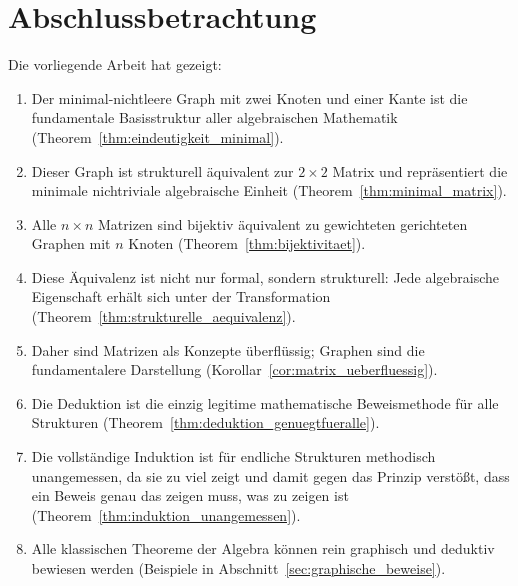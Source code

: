 \documentclass[12pt, a4paper]{article}
\theoremstyle{definition}
\theoremstyle{remark}
\begin{document}
\section{Abschlussbetrachtung}
\label{sec:abschluss}

Die vorliegende Arbeit hat gezeigt:

\begin{enumerate}[label=(\roman*)]
  \item Der minimal-nichtleere Graph mit zwei Knoten und einer Kante ist die fundamentale Basisstruktur aller algebraischen Mathematik (Theorem~\ref{thm:eindeutigkeit_minimal}).
  
  \item Dieser Graph ist strukturell äquivalent zur $2 \times 2$ Matrix und repräsentiert die minimale nichtriviale algebraische Einheit (Theorem~\ref{thm:minimal_matrix}).
  
  \item Alle $n \times n$ Matrizen sind bijektiv äquivalent zu gewichteten gerichteten Graphen mit $n$ Knoten (Theorem~\ref{thm:bijektivitaet}).
  
  \item Diese Äquivalenz ist nicht nur formal, sondern strukturell: Jede algebraische Eigenschaft erhält sich unter der Transformation (Theorem~\ref{thm:strukturelle_aequivalenz}).
  
  \item Daher sind Matrizen als Konzepte überflüssig; Graphen sind die fundamentalere Darstellung (Korollar~\ref{cor:matrix_ueberfluessig}).
  
  \item Die Deduktion ist die einzig legitime mathematische Beweismethode für alle Strukturen (Theorem~\ref{thm:deduktion_genuegtfueralle}).
  
  \item Die vollständige Induktion ist für endliche Strukturen methodisch unangemessen, da sie zu viel zeigt und damit gegen das Prinzip verstößt, dass ein Beweis genau das zeigen muss, was zu zeigen ist (Theorem~\ref{thm:induktion_unangemessen}).
  
  \item Alle klassischen Theoreme der Algebra können rein graphisch und deduktiv bewiesen werden (Beispiele in Abschnitt~\ref{sec:graphische_beweise}).
\end{enumerate}
\end{document}
